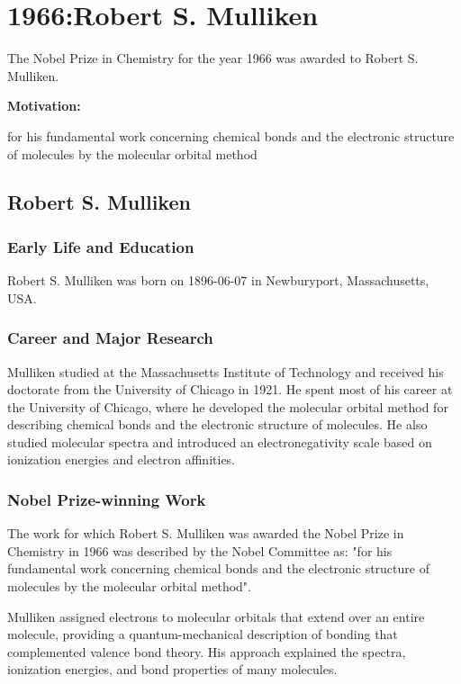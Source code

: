 \chapter{1966:Robert S. Mulliken}

\label{chap:chemistry1966}

The Nobel Prize in Chemistry for the year 1966 was awarded to Robert S. Mulliken.

\textbf{Motivation:}

for his fundamental work concerning chemical bonds and the electronic structure of molecules by the molecular orbital method

\section{Robert S. Mulliken}

\subsection*{Early Life and Education}

Robert S. Mulliken was born on 1896-06-07 in Newburyport, Massachusetts, USA.

\subsection*{Career and Major Research}

Mulliken studied at the Massachusetts Institute of Technology and received his doctorate from the University of Chicago in 1921. He spent most of his career at the University of Chicago, where he developed the molecular orbital method for describing chemical bonds and the electronic structure of molecules. He also studied molecular spectra and introduced an electronegativity scale based on ionization energies and electron affinities.

\subsection*{Nobel Prize-winning Work}

The work for which Robert S. Mulliken was awarded the Nobel Prize in Chemistry in 1966 was described by the Nobel Committee as: "for his fundamental work concerning chemical bonds and the electronic structure of molecules by the molecular orbital method".

Mulliken assigned electrons to molecular orbitals that extend over an entire molecule, providing a quantum-mechanical description of bonding that complemented valence bond theory. His approach explained the spectra, ionization energies, and bond properties of many molecules.

